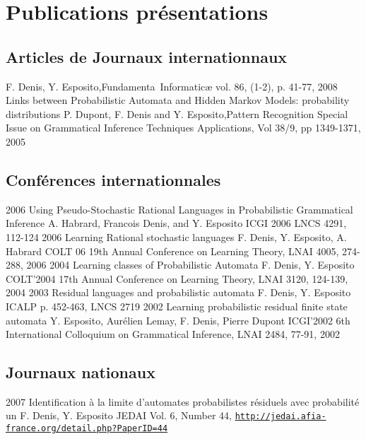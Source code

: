 \section*{Publications \amper{} présentations}

\subsection*{Articles de Journaux internationnaux}

{ F. Denis, Y. Esposito,}{Fundamenta~Informatic\ae{}}
{vol. 86, (1-2), p. 41-77, 2008}
{Links between Probabilistic Automata and Hidden Markov Models: probability distributions}
{ P. Dupont, F. Denis and Y. Esposito,}{Pattern Recognition}
{Special Issue on Grammatical Inference Techniques \amper{} Applications, Vol 38/9, pp 1349-1371, 2005}

\subsection*{Conférences internationnales}


\article
{2006} %
{Using Pseudo-Stochastic Rational Languages in Probabilistic Grammatical Inference} %
{A. Habrard, Francois Denis, and Y. Esposito} %
{ICGI 2006} %
{LNCS 4291, 112-124} %
\article
{2006}
{Learning Rational stochastic languages}
{F. Denis, Y. Esposito, A. Habrard}
{COLT 06}
{19th Annual Conference on Learning Theory, LNAI 4005, 274-288, 2006}
\article
{2004}
{Learning classes of Probabilistic Automata}
{F. Denis, Y. Esposito}
{COLT'2004}
{17th Annual Conference on Learning Theory, LNAI 3120, 124-139, 2004}
\article
{2003}
{Residual languages and probabilistic automata}
{F. Denis, Y. Esposito}
{ICALP}
{p. 452-463, LNCS 2719}
\article
{2002}
{Learning probabilistic residual finite state automata}
{Y. Esposito, Aurélien Lemay, F. Denis, Pierre Dupont}
{ICGI'2002}
{6th International Colloquium on Grammatical Inference,  LNAI 2484, 77-91, 2002}

\subsection*{Journaux nationaux}

\article
{2007}
{Identification à la limite d'automates probabilistes résiduels avec probabilité un}
{F. Denis, Y. Esposito}
{JEDAI}
{Vol. 6, Number 44, \href{http://jedai.afia-france.org/detail.php?PaperID=44}{\texttt{http://jedai.afia-france.org/detail.php?PaperID=44}}}

